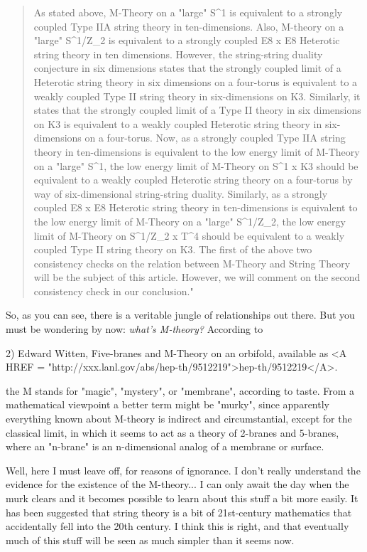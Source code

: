 \begin{quote}
As stated above, M-Theory on a "large" S^1 is equivalent to a 
strongly
coupled Type IIA string theory in ten-dimensions. Also, M-theory on a
"large" S^1/Z_2 is equivalent to a strongly coupled E8 x E8 Heterotic
string theory in ten dimensions.  However, the string-string duality
conjecture in six dimensions states that the strongly coupled limit of a
Heterotic string theory in six dimensions on a four-torus is equivalent
to a weakly coupled Type II string theory in six-dimensions on K3.
Similarly, it states that the strongly coupled limit of a Type II theory
in six dimensions on K3 is equivalent to a weakly coupled Heterotic
string theory in six-dimensions on a four-torus.  Now, as a strongly
coupled Type IIA string theory in ten-dimensions is equivalent to the
low energy limit of M-Theory on a "large" S^1, the low energy limit of
M-Theory on S^1 x K3 should be equivalent to a weakly coupled Heterotic
string theory on a four-torus by way of six-dimensional string-string
duality.  Similarly, as a strongly coupled E8 x E8 Heterotic string
theory in ten-dimensions is equivalent to the low energy limit of
M-Theory on a "large" S^1/Z_2, the low energy limit of M-Theory on
S^1/Z_2 x T^4 should be equivalent to a weakly coupled Type II string
theory on K3.  The first of the above two consistency checks on the
relation between M-Theory and String Theory will be the subject of this
article.  However, we will comment on the second consistency check in our
conclusion."
\end{quote}

So, as you can see, there is a veritable jungle of relationships out
there.  But you must be wondering by now: \emph{what's M-theory?} 
According to

2) Edward Witten, Five-branes and M-Theory on an orbifold, 
available as <A HREF = "http://xxx.lanl.gov/abs/hep-th/9512219">hep-th/9512219</A>.  

the M stands for "magic", "mystery", or "membrane", according to taste.
From a mathematical viewpoint a better term might be "murky", since
apparently everything known about M-theory is indirect and
circumstantial, except for the classical limit, in which it seems to act
as a theory of 2-branes and 5-branes, where an "n-brane" is an
n-dimensional analog of a membrane or surface.  

Well, here I must leave off, for reasons of ignorance.  I don't really
understand the evidence for the existence of the M-theory... I can only
await the day when the murk clears and it becomes possible to learn
about this stuff a bit more easily.  It has been suggested that string
theory is a bit of 21st-century mathematics that accidentally fell into
the 20th century.  I think this is right, and that eventually much of
this stuff will be seen as much simpler than it seems now.


